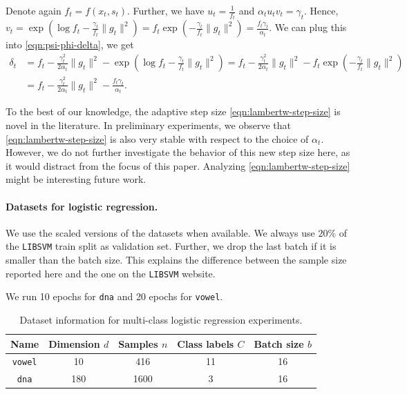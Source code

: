 \documentclass{article}
\theoremstyle{plain}
\theoremstyle{definition}
\theoremstyle{remark}
\begin{document}
Denote again $f_t = f(x_t,s_t)$. Further, we have $u_t = \frac{1}{f_t}$ and $\alpha_tu_tv_t = \gamma_t$. Hence, $v_t = \exp(\log f_t - \frac{\gamma_t}{f_t}\|g_t\|^2) = f_t \exp(- \frac{\gamma_t}{f_t}\|g_t\|^2) = \frac{f_t \gamma_t}{\alpha_t}$. We can plug this into \eqref{eqn:psi-phi-delta}, we get
\begin{align*}
    \delta_t &= f_t - \frac{\gamma_t^2}{2\alpha_t}\|g_t\|^2 - \exp(\log f_t - \frac{\gamma_t}{f_t}\|g_t\|^2) = f_t - \frac{\gamma_t^2}{2\alpha_t}\|g_t\|^2 - f_t\exp(- \frac{\gamma_t}{f_t}\|g_t\|^2) \\
    &= f_t - \frac{\gamma_t^2}{2\alpha_t}\|g_t\|^2 - \frac{f_t\gamma_t}{\alpha_t}.
\end{align*}

To the best of our knowledge, the adaptive step size \eqref{eqn:lambertw-step-size} is novel in the literature. In preliminary experiments, we observe that \eqref{eqn:lambertw-step-size} is also very stable with respect to the choice of $\alpha_t$. However, we do not further investigate the behavior of this new step size here, as it would distract from the focus of this paper. Analyzing \eqref{eqn:lambertw-step-size} might be interesting future work.


\paragraph{Datasets for logistic regression.}

We use the scaled versions of the datasets when available. We always use $20\%$ of the \texttt{LIBSVM} train split as validation set. Further, we drop the last batch if it is smaller than the batch size. This explains the difference between the sample size reported here and the one on the \texttt{LIBSVM} website.

We run 10 epochs for \texttt{dna} and 20 epochs for \texttt{vowel}.

\begin{table}[H]
    \centering
    \caption{Dataset information for multi-class logistic regression experiments.}
    \label{tab:logreg-datasets}
    \begin{tabular}{|c|cccc|}
         \hline
         Name & Dimension $d$ & Samples $n$ & Class labels $C$ & Batch size $b$ \\
         \hline
         \texttt{vowel} & 10 & 416 & 11 & 16 \\
         \texttt{dna} & 180 & 1600 & 3 & 16  \\
         \hline
    \end{tabular}
\end{table}
\end{document}
